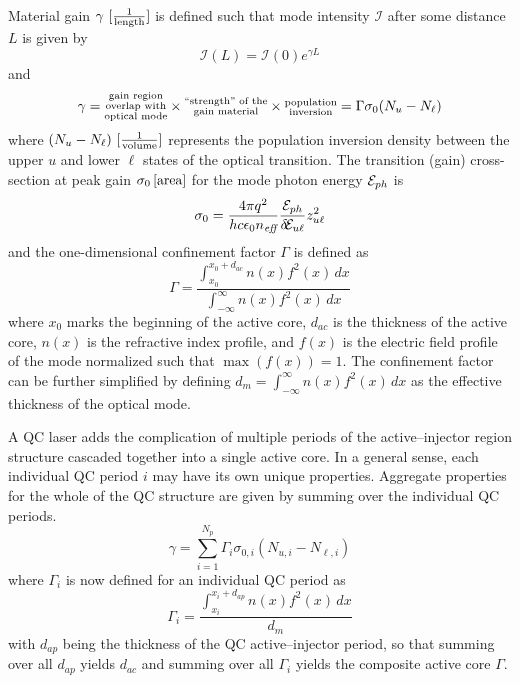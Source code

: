 \documentclass[12pt]{report}
\begin{document}
Material gain $\gamma~[\frac{1}{\textnormal{length}}]$ is defined such that mode intensity $\mathcal{I}$ after some distance $L$ is given by
\begin{equation}
\mathcal{I}(L) = \mathcal{I}(0) e^{\gamma L}
\end{equation}
and
\begin{equation}
\gamma = \begin{subarray}{c}\textnormal{gain region}\\\textnormal{overlap with}\\\textnormal{optical mode}\end{subarray} \times \begin{subarray}{c}\textnormal{``strength'' of the}\\\textnormal{gain material}\end{subarray}
\times \begin{subarray}{c}\textnormal{population}\\\textnormal{inversion}\end{subarray} = \Gamma \sigma_0 (N_u-N_\ell)
\end{equation}
where $(N_u-N_\ell)~[\frac{1}{\textnormal{volume}}]$ represents the population inversion density between the upper $u$ and lower $\ell$ states of the optical transition. The transition (gain) cross-section at peak gain $\sigma_0 \left[\textnormal{area}\right]$ for the mode photon energy $\EE_{ph}$ is
\begin{equation}
\sigma_0 = \frac{4 \pi q^2}{h c \epsilon_0 n_\textit{eff}} \frac{\EE_{ph}}{\delta\!\EE_{u\ell}} z_{u\ell}^2
\end{equation}
and the one-dimensional confinement factor $\Gamma$ is defined as
\begin{equation}
\label{chpt1eqn:Gamma}
\Gamma = \frac{\int_{x_0}^{x_0+d_{ac}} \! n(x) f^2(x) \, dx}{\int_{-\infty}^{\infty} \! n(x) f^2(x) \, dx}
\end{equation}
where $x_0$ marks the beginning of the active core, $d_{ac}$ is the thickness of the active core, $n(x)$ is the refractive index profile, and $f(x)$ is the electric field profile of the mode normalized such that $\max(f(x))=1$.  The confinement factor can be further simplified by defining $d_m=\int_{-\infty}^{\infty} \! n(x) f^2(x) \, dx$ as the effective thickness of the optical mode.

A QC laser adds the complication of multiple periods of the active--injector region structure cascaded together into a single active core.  In a general sense, each individual QC period $i$ may have its own unique properties.  Aggregate properties for the whole of the QC structure are given by summing over the individual QC periods.
\begin{equation}
\gamma = \sum_{i=1}^{N_p} \Gamma_i \sigma_{0,i} (N_{u,i}-N_{\ell,i})
\end{equation}
where $\Gamma_i$ is now defined for an individual QC period as
\begin{equation}
\Gamma_i = \frac{\int_{x_i}^{x_i+d_{ap}} \! n(x) f^2(x) \, dx}{d_m}
\end{equation}
with $d_{ap}$ being the thickness of the QC active--injector period, so that summing over all $d_{ap}$ yields $d_{ac}$ and summing over all $\Gamma_i$ yields the composite active core $\Gamma$.
\end{document}
